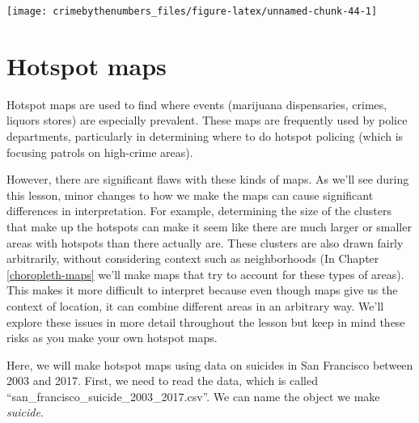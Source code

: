 \documentclass[
  12pt,
  openany]{book}
\begin{document}
\begin{center}\texttt{[image: crimebythenumbers\_files/figure-latex/unnamed-chunk-44-1]} \end{center}

\hypertarget{hotspot-maps}{%
\chapter{Hotspot maps}\label{hotspot-maps}}

Hotspot maps are used to find where events (marijuana dispensaries, crimes, liquors stores) are especially prevalent. These maps are frequently used by police departments, particularly in determining where to do hotspot policing (which is focusing patrols on high-crime areas).

However, there are significant flaws with these kinds of maps. As we'll see during this lesson, minor changes to how we make the maps can cause significant differences in interpretation. For example, determining the size of the clusters that make up the hotspots can make it seem like there are much larger or smaller areas with hotspots than there actually are. These clusters are also drawn fairly arbitrarily, without considering context such as neighborhoods (In Chapter \ref{choropleth-maps} we'll make maps that try to account for these types of areas). This makes it more difficult to interpret because even though maps give us the context of location, it can combine different areas in an arbitrary way. We'll explore these issues in more detail throughout the lesson but keep in mind these risks as you make your own hotspot maps.

Here, we will make hotspot maps using data on suicides in San Francisco between 2003 and 2017. First, we need to read the data, which is called ``san\_francisco\_suicide\_2003\_2017.csv''. We can name the object we make \emph{suicide}.
\end{document}
